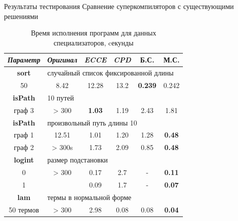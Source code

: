 \documentclass[xcolor=table]{beamer}
\begin{document}
\begin{frame}{Результаты тестирования}
    {\small Сравнение суперкомпиляторов с существующими решениями}
\begin{table}
\center
\begin{tabular}{|c|c|c|c|c|c|}
\hline
{\it Параметр} & {\it Оригинал} & {\it ECCE }  & {\it CPD} & {\bf Б.С.} & {\bf М.С.} \\ \hline
\rowcolor{black!10}
{\bf sort} & \multicolumn{5}{|l|}{случайный список фиксированной длины } \\ \hline
50       & 8.42     & 12.28 & 13.2 & {\bf 0.239} & 0.242 \\ \hline

\rowcolor{black!10}
 {\bf isPath} & \multicolumn{5}{|l|}{10 путей} \\ \hline
  граф 3      & > 300 & {\bf 1.03} & 1.19 & 2.43 & 1.81 \\ \hline
\rowcolor{black!10}
 {\bf isPath} & \multicolumn{5}{|l|}{произвольный путь длины 10} \\ \hline
 граф 1  &  12.51  & 1.01 & 1.20 & 1.28 &  {\bf 0.48} \\
 граф 2  &  > 300s & 1.73 & 2.09 & 0.85 & {\bf 0.48} \\ 
 \hline

\rowcolor{black!10}
{\bf logint} & \multicolumn{5}{|l|}{размер подстановки} \\ \hline
0 & > 300    & 0.17  & 2.7  & - & {\bf 0.11} \\
1 &          & 0.09  & 1.7  & - & {\bf 0.07} \\
\hline

\rowcolor{black!10}
{\bf lam} & \multicolumn{5}{|l|}{термы в нормальной форме} \\ \hline
50 термов & > 300    & 2.98  & 0.08 & 0.08 & {\bf 0.04}   \\
\hline
\end{tabular}
\caption{Время исполнения программ для данных специализаторов, cекунды}
\label{fig:totalResult}
\end{table}
\end{frame}
\end{document}
